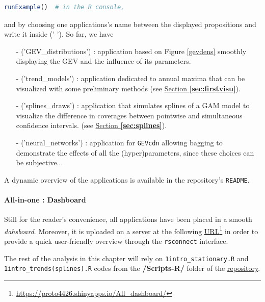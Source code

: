 \begin{center}
\begin{lstlisting}[language=R]
runExample()  # in the R console,
\end{lstlisting}
\end{center}
and by choosing one applications's name between the displayed propositions and write it inside (' ').
So far, we have
\begin{itemize}
	\item[-]('GEV\_distributions') :  application based on Figure \ref{gevdens} smoothly displaying the GEV and the influence of its parameters.
	
	\item[-] ('trend\_models') :
	application dedicated to annual maxima that can be visualized with some preliminary methods (see \hyperref[sec:firstvisu]{Section \textbf{\ref{sec:firstvisu}}}).
	
	\item[-] ('splines\_draws') : application that simulates splines of a GAM model to visualize the difference in coverages between pointwise and simultaneous confidence intervals. (see \hyperref[sec:splines]{Section \textbf{\ref{sec:splines}}}).

	\item[-] ('neural\_networks') : 
	application for \texttt{GEVcdn} allowing bagging to demonstrate the effects of all the (hyper)parameters, since these choices can be subjective...
\end{itemize}
A dynamic overview of the applications is available in the repository's \texttt{README}.

\paragraph*{All-in-one : Dashboard} 
Still for the reader's convenience, all applications have been placed in a smooth \emph{dahsboard}. Moreover, it is uploaded on a server at the following \href{https://proto4426.shinyapps.io/All\_dashboard/}{URL}\footnote{\url{https://proto4426.shinyapps.io/All\_dashboard/}}
 in order to provide a quick user-friendly overview through the \texttt{rsconnect} interface.
 
The rest of the analysis in this chapter will rely on \texttt{1intro\_stationary.R} and \\ \texttt{1intro\_trends(splines).R} codes from the \textbf{/Scripts-R/} folder of the \href{https://github.com/proto4426/PissoortThesis}{repository}.


